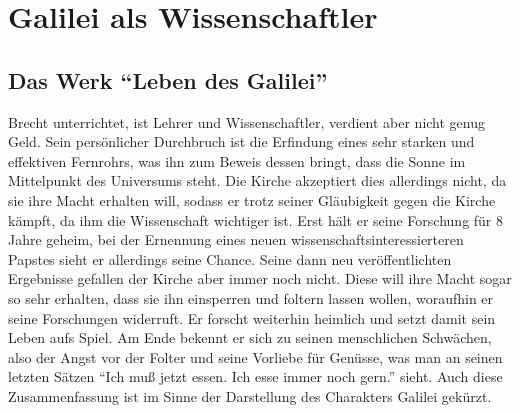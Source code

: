 \documentclass[12pt]{scrreprt}
\begin{document}
\chapter{Galilei als Wissenschaftler}
	\label{chap:galilei als wissenschaftler}
\section{Das Werk \enquote{Leben des Galilei}}
	\label{sec:das werk leben des galilei}
Brecht unterrichtet, ist Lehrer und Wissenschaftler, verdient aber nicht genug Geld.
Sein persönlicher Durchbruch ist die Erfindung eines sehr starken und effektiven Fernrohrs, was ihn zum Beweis dessen bringt, dass die Sonne im Mittelpunkt des Universums steht.
Die Kirche akzeptiert dies allerdings nicht, da sie ihre Macht erhalten will, sodass er trotz seiner Gläubigkeit gegen die Kirche kämpft, da ihm die Wissenschaft wichtiger ist.
Erst hält er seine Forschung für 8 Jahre geheim, bei der Ernennung eines neuen wissenschaftsinteressierteren Papstes sieht er allerdings seine Chance.
Seine dann neu veröffentlichten Ergebnisse gefallen der Kirche aber immer noch nicht.
Diese will ihre Macht sogar so sehr erhalten, dass sie ihn einsperren und foltern lassen wollen, woraufhin er seine Forschungen widerruft.
Er forscht weiterhin heimlich und setzt damit sein Leben aufs Spiel.
Am Ende bekennt er sich zu seinen menschlichen Schwächen, also der Angst vor der Folter und seine Vorliebe für Genüsse, was man an seinen letzten Sätzen \enquote{Ich muß jetzt essen. Ich esse immer noch gern.} sieht.
Auch diese Zusammenfassung ist im Sinne der Darstellung des Charakters Galilei gekürzt.
\autocite{wiki:Galilei_Studyflix}
\autocite{wiki:Leben_des_Galilei}
\end{document}
